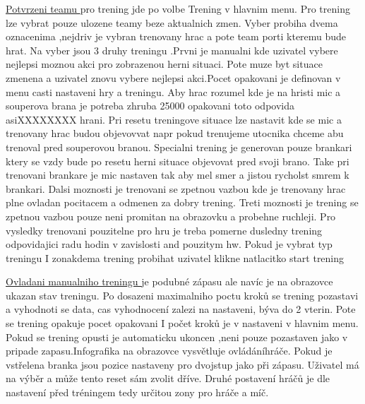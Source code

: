 \documentclass[
  program=ainfk,
  biblatex,
  language=czech,
  figures=true,
  tables ,
  sourcecodes=true,
  glossaries=true,
  index
]{kidiplom}
\begin{document}
\underline{Potvrzeni teamu } pro trening jde po volbe Trening v hlavnim menu. Pro trening lze vybrat pouze ulozene teamy beze aktualnich zmen. Vyber probiha dvema oznacenima ,nejdriv je vybran trenovany hrac a pote team porti kteremu bude hrat. Na vyber jsou 3 druhy treningu .Prvni je manualni kde uzivatel vybere nejlepsi moznou akci pro zobrazenou herni situaci. Pote muze byt situace zmenena a uzivatel znovu vybere nejlepsi akci.Pocet opakovani je definovan v menu casti nastaveni hry a treningu. Aby hrac rozumel kde je na hristi mic a souperova brana je potreba zhruba 25000 opakovani toto odpovida asiXXXXXXXX hrani. Pri resetu treningove situace lze nastavit kde se mic a trenovany hrac budou objevovvat napr pokud trenujeme utocnika chceme abu trenoval pred souperovou branou. Specialni trening je generovan pouze brankari ktery se vzdy bude po resetu herni situace objevovat pred svoji brano. Take pri trenovani brankare je mic nastaven tak aby mel smer a jistou rycholst smrem k brankari. 
Dalsi moznosti je trenovani se zpetnou vazbou kde je trenovany hrac plne ovladan pocitacem a odmenen za dobry trening. Treti moznosti je trening se zpetnou vazbou pouze neni promitan na obrazovku a probehne ruchleji. Pro vysledky trenovani pouzitelne pro hru je treba pomerne dusledny trening odpovidajici radu hodin v zavislosti and pouzitym hw.
Pokud je vybrat typ treningu I zonakdema trening probihat uzivatel klikne natlacitko start trening

\underline{Ovladani manualniho treningu }  je podubné zápasu ale navíc je na obrazovce ukazan stav treningu. Po dosazeni maximalniho poctu kroků se trening pozastavi a vyhodnoti se data, cas vyhodnocení zalezi na nastaveni, býva do 2 vterin. Pote se trening opakuje pocet opakovani I počet kroků je v nastaveni v hlavnim menu. Pokud se trening opusti je automaticku ukoncen ,neni pouze pozastaven jako v pripade zapasu.Infografika na obrazovce vysvětluje ovládáníhráče. Pokud je vstřelena branka jsou pozice nastaveny pro dvojstup jako při zápasu. Uživatel má na výběr a může tento reset sám zvolit dříve. Druhé postavení hráčů je dle nastavení před tréningem tedy určitou zony pro hráče a míč. 
\end{document}
